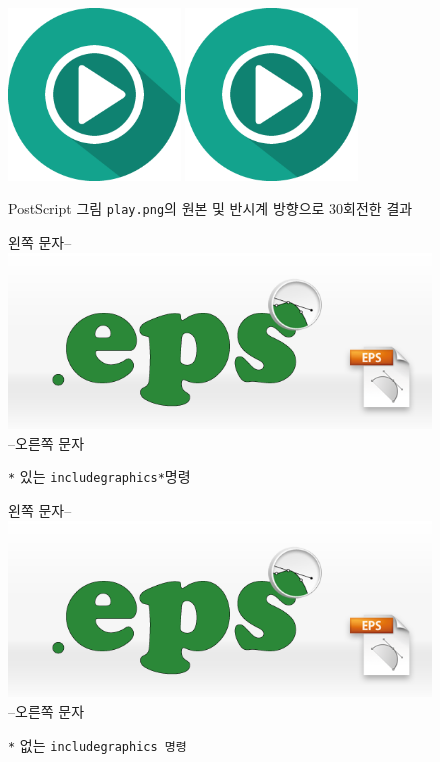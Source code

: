 \documentclass[11pt]{article}
\begin{document}
\begin{figure}[t]
\begin{center}
\includegraphics[width=1.8in]{play.png}
\includegraphics[width=1.8in, angle=-30]{play.png}
\caption[그림의 회전]{PostScript 그림 \texttt{play.png}의 원본 및 반시계 방향으로 30\textdegree 회전한 결과 \label{fig:play}}
\end{center}
\end{figure}

\begin{figure}[t]
왼쪽 문자--
\includegraphics*[bb=14 64 70 85]{eps.png}
--오른쪽 문자
\caption{\texttt{*} 있는 \texttt{includegraphics*}명령 \label{fig:include*}}
\end{figure}

\begin{figure}[t]
왼쪽 문자--
\includegraphics*[bb=14 64 70 85]{eps.png}
--오른쪽 문자
\caption{\texttt{*} 없는 \texttt{includegraphics 명령 \label{fig:include0}}}
\end{figure}
\end{document}
